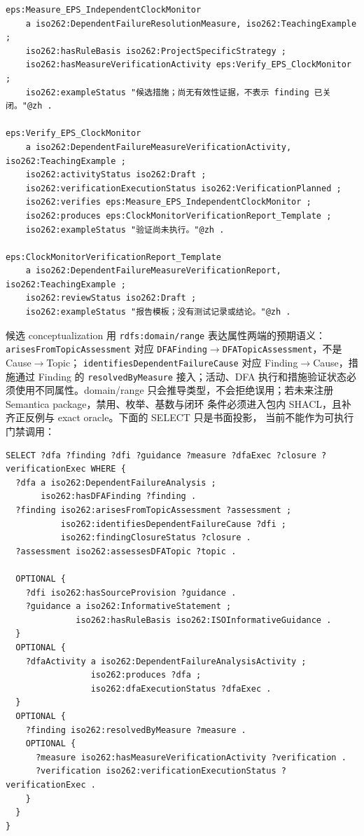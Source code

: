 \begin{codebox}
\begin{Verbatim}[fontsize=\small,breaklines=true,breakanywhere=true,breaksymbolleft={},breaksymbolright={}]
eps:Measure_EPS_IndependentClockMonitor
    a iso262:DependentFailureResolutionMeasure, iso262:TeachingExample ;
    iso262:hasRuleBasis iso262:ProjectSpecificStrategy ;
    iso262:hasMeasureVerificationActivity eps:Verify_EPS_ClockMonitor ;
    iso262:exampleStatus "候选措施；尚无有效性证据，不表示 finding 已关闭。"@zh .

eps:Verify_EPS_ClockMonitor
    a iso262:DependentFailureMeasureVerificationActivity, iso262:TeachingExample ;
    iso262:activityStatus iso262:Draft ;
    iso262:verificationExecutionStatus iso262:VerificationPlanned ;
    iso262:verifies eps:Measure_EPS_IndependentClockMonitor ;
    iso262:produces eps:ClockMonitorVerificationReport_Template ;
    iso262:exampleStatus "验证尚未执行。"@zh .

eps:ClockMonitorVerificationReport_Template
    a iso262:DependentFailureMeasureVerificationReport, iso262:TeachingExample ;
    iso262:reviewStatus iso262:Draft ;
    iso262:exampleStatus "报告模板；没有测试记录或结论。"@zh .
\end{Verbatim}
\end{codebox}

候选 conceptualization 用 \nolinkurl{rdfs:domain/range} 表达属性两端的预期语义：
\nolinkurl{arisesFromTopicAssessment} 对应 \allowbreak{}\texttt{DFAFinding\(\rightarrow\)DFATopic\allowbreak{}Assessment}\allowbreak{}，不是 Cause\(\rightarrow\)Topic；
\nolinkurl{identifiesDependentFailureCause} 对应 Finding\(\rightarrow\)Cause，措施通过 Finding 的
\nolinkurl{resolvedByMeasure} 接入；活动、DFA 执行和措施验证状态必须使用不同属性。domain/range
只会推导类型，不会拒绝误用；若未来注册 Semantica package，禁用、枚举、基数与闭环
条件必须进入包内 SHACL，且补齐正反例与 exact oracle。下面的 SELECT 只是书面投影，
当前不能作为可执行门禁调用：

\nopagebreak[4]
\begin{codebox}
\begin{Verbatim}[fontsize=\small,breaklines=true,breakanywhere=true,breaksymbolleft={},breaksymbolright={}]
SELECT ?dfa ?finding ?dfi ?guidance ?measure ?dfaExec ?closure ?verificationExec WHERE {
  ?dfa a iso262:DependentFailureAnalysis ;
       iso262:hasDFAFinding ?finding .
  ?finding iso262:arisesFromTopicAssessment ?assessment ;
           iso262:identifiesDependentFailureCause ?dfi ;
           iso262:findingClosureStatus ?closure .
  ?assessment iso262:assessesDFATopic ?topic .

  OPTIONAL {
    ?dfi iso262:hasSourceProvision ?guidance .
    ?guidance a iso262:InformativeStatement ;
              iso262:hasRuleBasis iso262:ISOInformativeGuidance .
  }
  OPTIONAL {
    ?dfaActivity a iso262:DependentFailureAnalysisActivity ;
                 iso262:produces ?dfa ;
                 iso262:dfaExecutionStatus ?dfaExec .
  }
  OPTIONAL {
    ?finding iso262:resolvedByMeasure ?measure .
    OPTIONAL {
      ?measure iso262:hasMeasureVerificationActivity ?verification .
      ?verification iso262:verificationExecutionStatus ?verificationExec .
    }
  }
}
\end{Verbatim}
\end{codebox}


